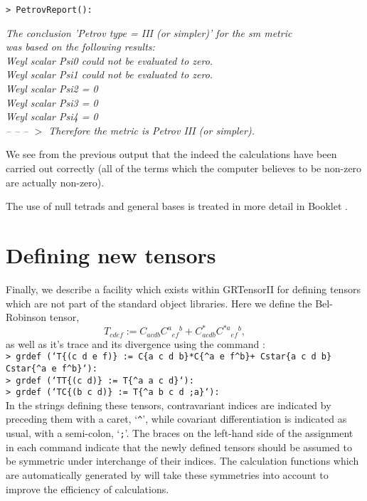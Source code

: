 \documentclass{article}
\begin{document}
{\noindent\texttt{> PetrovReport():}
\begin{center}\textit{
  The conclusion 'Petrov type = III (or simpler)' for the sm metric\\
  was based on the following results:\\
  Weyl scalar Psi0 could not be evaluated to zero.\\
  Weyl scalar Psi1 could not be evaluated to zero.\\
  Weyl scalar Psi2 = 0\\
  Weyl scalar Psi3 = 0\\
  Weyl scalar Psi4 = 0}\\

\textit{-- -- -- $>$ Therefore the metric is Petrov III (or simpler).
}
\end{center}

\noindent We see from the previous output that the indeed the calculations
have been carried out correctly (all of the terms which the computer believes
to be non-zero are actually non-zero).

The use of null tetrads and general bases is treated in more detail in
Booklet \grBasisRef.
%
\section{Defining new tensors}
Finally, we describe a facility which exists within GRTensorII for defining
tensors which are not part of the standard object libraries. Here we
define the Bel-Robinson tensor, 
\[
  T_{cdef} := C_{acdb}C^a{}_{ef}{}^b+C^*_{acdb}C^{*a}{}_{ef}{}^b,\qquad
\]
as well as it's trace and its divergence using the command :\\

\noindent\texttt{> grdef (`T\{(c d e f)\} := C\{a c d b\}*C\{\^{}a e f\^{}b\}+
  Cstar\{a c d b\}\\
  \indent *Cstar\{\^{}a e f\^{}b\}`):\\
> grdef (`TT\{(c d)\} := T\{\^{}a a c d\}`):\\
> grdef (`TC\{(b c d)\} := T\{\^{}a b c d ;a\}`):}\\

\noindent In the strings defining these tensors, contravariant 
indices are indicated by preceding them with a caret, `\texttt{\^{}}',
while covariant differentiation is indicated as usual, with a
semi-colon, `\texttt{;}'.  The braces on the left-hand side of the
assignment in each command indicate that the newly defined tensors
should be assumed to be symmetric under interchange of their indices.
The calculation functions which are automatically generated by
 will take these symmetries into account to improve the
efficiency of calculations.

}
\end{document}
